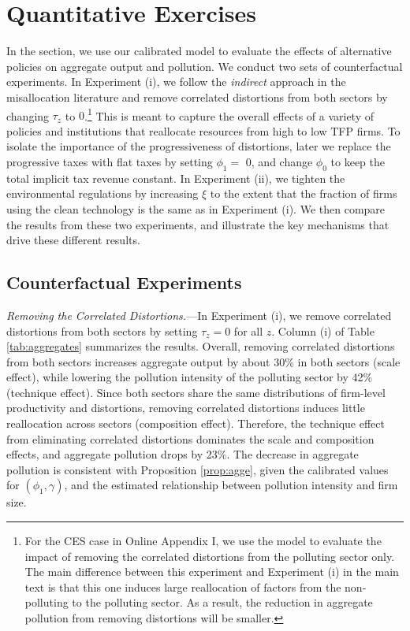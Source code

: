 \documentclass[AEJ]{AEA}
\begin{document}
\section{Quantitative Exercises}

In the section, we use our calibrated model to evaluate the effects of alternative policies on aggregate output and pollution. We conduct two sets of counterfactual experiments.  In Experiment (i), we follow the \emph{indirect} approach in the misallocation literature and remove correlated distortions from both sectors by changing $\tau_z$ to $0$.\footnote{For the CES case in Online Appendix I, we use the model to evaluate the impact of removing the correlated distortions from the polluting sector only. The main difference between this experiment and Experiment (i) in the main text is that this one induces large reallocation of factors from the non-polluting to the polluting sector. As a result, the reduction in aggregate pollution from removing distortions will be smaller. } This is meant to capture the overall effects of a variety of policies and institutions that reallocate resources from high to low TFP firms. To isolate the importance of the {progressiveness} of distortions, later we replace the progressive taxes with flat taxes by setting $\phi_1 = $ 0, and change $\phi_0$ to keep the total implicit tax revenue constant. In Experiment (ii), we tighten the environmental regulations by increasing $\xi$ to the extent that the fraction of firms using the clean technology is the same as in Experiment (i). We then compare the results from these two experiments, and illustrate the key mechanisms that drive these different results.

\subsection{Counterfactual Experiments}

\textit{Removing the Correlated Distortions.}---In Experiment (i), we remove correlated distortions from both sectors by setting $\tau_z = 0$ for all $z$. Column (i) of Table \ref{tab:aggregates} summarizes the results. Overall, removing correlated distortions from both sectors increases aggregate output by about 30\% in both sectors (scale effect), while lowering the pollution intensity of the polluting sector by 42\% (technique effect). Since both sectors share the same distributions of firm-level productivity and distortions, removing correlated distortions induces little reallocation across sectors (composition effect). Therefore, the technique effect from eliminating correlated distortions dominates the scale and composition effects, and aggregate pollution drops by 23\%. The decrease in aggregate pollution is consistent with Proposition \ref{prop:agge}, given the calibrated values for $(\phi_1, \gamma)$, and the estimated relationship between pollution intensity and firm size.
\end{document}
